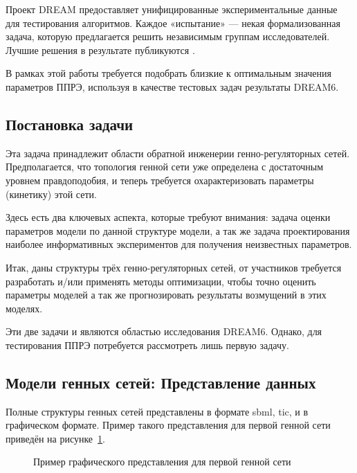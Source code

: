 Проект DREAM предоставляет унифицированные экспериментальные данные для 
тестирования алгоритмов. Каждое «испытание» — некая формализованная задача,
которую предлагается решить независимым группам исследователей. Лучшие 
решения в результате публикуются \cite{bib6}. 

В рамках этой работы требуется подобрать близкие к оптимальным значения 
параметров ППРЭ, используя в качестве тестовых задач результаты DREAM6.

\subsection{Постановка задачи} \label{s2_1}

Эта задача принадлежит области обратной инженерии генно-регуляторных сетей. 
Предполагается, что топология генной сети уже определена с достаточным уровнем 
правдоподобия, и теперь требуется охарактеризовать параметры (кинетику) 
этой сети.

Здесь есть два ключевых аспекта, которые требуют внимания: задача оценки 
параметров модели по данной структуре модели, а так же задача проектирования 
наиболее информативных экспериментов для получения неизвестных параметров. 

Итак, даны структуры трёх генно-регуляторных сетей, от участников требуется 
разработать и/или применять методы оптимизации, чтобы точно оценить 
параметры моделей а так же прогнозировать результаты возмущений в этих моделях.

Эти две задачи и являются областью исследования DREAM6. Однако, для тестирования
ППРЭ потребуется рассмотреть лишь первую задачу.

\subsection{Модели генных сетей: Представление данных} \label{s2_2}

Полные структуры генных сетей представлены в формате sbml, tic, и в графическом 
формате. Пример такого представления для первой генной сети приведён на 
рисунке~\ref{img:GrnImage}.

\begin{figure}[h]
  \caption{Пример графического представления для первой генной сети}
  \label{img:GrnImage}
\end{figure}

